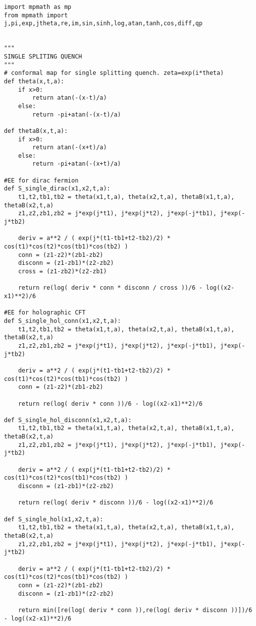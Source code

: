 \begin{lstlisting}
import mpmath as mp
from mpmath import j,pi,exp,jtheta,re,im,sin,sinh,log,atan,tanh,cos,diff,qp


"""
SINGLE SPLITING QUENCH
"""
# conformal map for single splitting quench. zeta=exp(i*theta)
def theta(x,t,a):
	if x>0:
		return atan(-(x-t)/a)
	else:
		return -pi+atan(-(x-t)/a)

def thetaB(x,t,a):
	if x>0:
		return atan(-(x+t)/a)
	else:
		return -pi+atan(-(x+t)/a)

#EE for dirac fermion
def S_single_dirac(x1,x2,t,a):
	t1,t2,tb1,tb2 = theta(x1,t,a), theta(x2,t,a), thetaB(x1,t,a), thetaB(x2,t,a)
	z1,z2,zb1,zb2 = j*exp(j*t1), j*exp(j*t2), j*exp(-j*tb1), j*exp(-j*tb2)

	deriv = a**2 / ( exp(j*(t1-tb1+t2-tb2)/2) * cos(t1)*cos(t2)*cos(tb1)*cos(tb2) )
	conn = (z1-z2)*(zb1-zb2)
	disconn = (z1-zb1)*(z2-zb2)
	cross = (z1-zb2)*(z2-zb1)

	return re(log( deriv * conn * disconn / cross ))/6 - log((x2-x1)**2)/6

#EE for holographic CFT
def S_single_hol_conn(x1,x2,t,a):
	t1,t2,tb1,tb2 = theta(x1,t,a), theta(x2,t,a), thetaB(x1,t,a), thetaB(x2,t,a)
	z1,z2,zb1,zb2 = j*exp(j*t1), j*exp(j*t2), j*exp(-j*tb1), j*exp(-j*tb2)

	deriv = a**2 / ( exp(j*(t1-tb1+t2-tb2)/2) * cos(t1)*cos(t2)*cos(tb1)*cos(tb2) )
	conn = (z1-z2)*(zb1-zb2)

	return re(log( deriv * conn ))/6 - log((x2-x1)**2)/6

def S_single_hol_disconn(x1,x2,t,a):
	t1,t2,tb1,tb2 = theta(x1,t,a), theta(x2,t,a), thetaB(x1,t,a), thetaB(x2,t,a)
	z1,z2,zb1,zb2 = j*exp(j*t1), j*exp(j*t2), j*exp(-j*tb1), j*exp(-j*tb2)

	deriv = a**2 / ( exp(j*(t1-tb1+t2-tb2)/2) * cos(t1)*cos(t2)*cos(tb1)*cos(tb2) )
	disconn = (z1-zb1)*(z2-zb2)

	return re(log( deriv * disconn ))/6 - log((x2-x1)**2)/6

def S_single_hol(x1,x2,t,a):
	t1,t2,tb1,tb2 = theta(x1,t,a), theta(x2,t,a), thetaB(x1,t,a), thetaB(x2,t,a)
	z1,z2,zb1,zb2 = j*exp(j*t1), j*exp(j*t2), j*exp(-j*tb1), j*exp(-j*tb2)

	deriv = a**2 / ( exp(j*(t1-tb1+t2-tb2)/2) * cos(t1)*cos(t2)*cos(tb1)*cos(tb2) )
	conn = (z1-z2)*(zb1-zb2)
	disconn = (z1-zb1)*(z2-zb2)

	return min([re(log( deriv * conn )),re(log( deriv * disconn ))])/6 - log((x2-x1)**2)/6



\end{lstlisting}
